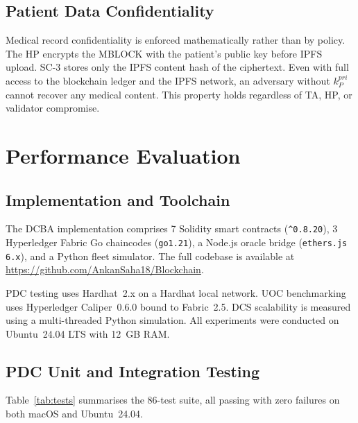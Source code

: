\documentclass[sigplan,screen,review=false]{acmart}
\begin{document}
\subsection{Patient Data Confidentiality}

Medical record confidentiality is enforced mathematically rather than
by policy. The HP encrypts the MBLOCK with the patient's public key
before IPFS upload. SC-3 stores only the IPFS content hash of the
ciphertext. Even with full access to the blockchain ledger and the IPFS
network, an adversary without $k^{pri}_P$ cannot recover any medical
content. This property holds regardless of TA, HP, or validator
compromise.

\section{Performance Evaluation}
\label{sec:evaluation}

\subsection{Implementation and Toolchain}

The DCBA implementation comprises 7 Solidity smart contracts
(\texttt{\^{}0.8.20}), 3 Hyperledger Fabric Go chaincodes
(\texttt{go1.21}), a Node.js oracle bridge (\texttt{ethers.js 6.x}),
and a Python fleet simulator. The full codebase is available at
\url{https://github.com/AnkanSaha18/Blockchain}.

PDC testing uses Hardhat~2.x on a Hardhat local network. UOC
benchmarking uses Hyperledger Caliper~0.6.0 bound to Fabric~2.5.
DCS scalability is measured using a multi-threaded Python simulation.
All experiments were conducted on Ubuntu~24.04 LTS with 12~GB RAM.

\subsection{PDC Unit and Integration Testing}

Table~\ref{tab:tests} summarises the 86-test suite, all passing with
zero failures on both macOS and Ubuntu~24.04.
\end{document}
